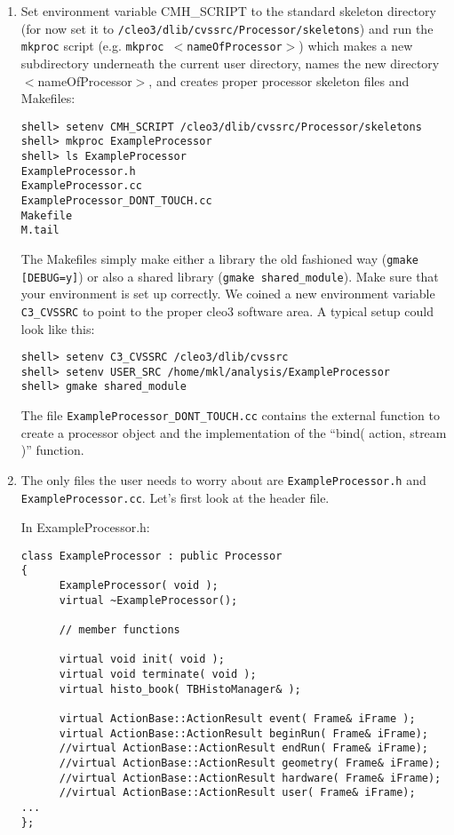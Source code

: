 \documentclass[12pt]{article}
\begin{document}
\begin{enumerate}

\item Set environment variable CMH\_SCRIPT to the standard
skeleton directory (for now set it
to \texttt{/cleo3/dlib/cvssrc/Processor/skeletons}) and run the
\texttt{mkproc} script (e.g. \texttt{mkproc $<$nameOfProcessor$>$})
which makes a new subdirectory underneath the current user directory,
names the new directory $<$nameOfProcessor$>$, and creates proper
processor skeleton files and Makefiles:
\begin{verbatim}
shell> setenv CMH_SCRIPT /cleo3/dlib/cvssrc/Processor/skeletons
shell> mkproc ExampleProcessor
shell> ls ExampleProcessor
ExampleProcessor.h
ExampleProcessor.cc
ExampleProcessor_DONT_TOUCH.cc
Makefile
M.tail
\end{verbatim}

The Makefiles simply make either a library the old fashioned way
(\texttt{gmake [DEBUG=y]}) or also a shared library (\texttt{gmake
shared\_module}). Make sure that your environment is set up
correctly. We coined a new environment variable \texttt{C3\_CVSSRC} to
point to the proper cleo3 software area. A typical setup could look like
this:
\begin{verbatim}
shell> setenv C3_CVSSRC /cleo3/dlib/cvssrc
shell> setenv USER_SRC /home/mkl/analysis/ExampleProcessor
shell> gmake shared_module 
\end{verbatim}


The file \texttt{ExampleProcessor\_DONT\_TOUCH.cc} contains the external
function to create a processor object  and the implementation of the
``bind( action, stream )'' function.

\item The only files the user needs to worry about are
\texttt{ExampleProcessor.h} and \texttt{ExampleProcessor.cc}.
Let's first look at the header file.

\noindent In ExampleProcessor.h:
\begin{verbatim}
class ExampleProcessor : public Processor
{
      ExampleProcessor( void );
      virtual ~ExampleProcessor();

      // member functions

      virtual void init( void );
      virtual void terminate( void );
      virtual histo_book( TBHistoManager& );

      virtual ActionBase::ActionResult event( Frame& iFrame );
      virtual ActionBase::ActionResult beginRun( Frame& iFrame);
      //virtual ActionBase::ActionResult endRun( Frame& iFrame);
      //virtual ActionBase::ActionResult geometry( Frame& iFrame);
      //virtual ActionBase::ActionResult hardware( Frame& iFrame);
      //virtual ActionBase::ActionResult user( Frame& iFrame);
...
};
\end{verbatim}


\end{enumerate}
\end{document}
